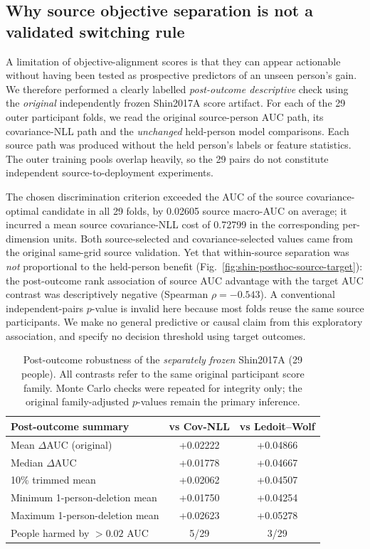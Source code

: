 \subsection{Why source objective separation is not a validated switching rule}
\label{sec:source-target-not-predictor}
A limitation of objective-alignment scores is that they can appear
actionable without having been tested as prospective predictors of an
unseen person's gain. We therefore performed a clearly labelled
\emph{post-outcome descriptive} check using the \emph{original}
independently frozen Shin2017A score artifact. For each of the 29
outer participant folds, we read the original source-person AUC
path, its covariance-NLL path and the \emph{unchanged} held-person
model comparisons. Each source path was produced without the
held person's labels or feature statistics. The outer training pools
overlap heavily, so the 29 pairs do not constitute independent
source-to-deployment experiments.

The chosen discrimination criterion exceeded the AUC of the
source covariance-optimal candidate in all 29 folds, by
0.02605 source macro-AUC on average; it incurred a mean
source covariance-NLL cost of 0.72799 in the corresponding
per-dimension units. Both source-selected and
covariance-selected values came from the original same-grid
source validation. Yet that within-source separation was
\emph{not} proportional to the held-person benefit
(Fig.~\ref{fig:shin-posthoc-source-target}): the post-outcome
rank association of source AUC advantage with the target
AUC contrast was descriptively negative (Spearman
$\rho=-0.543$). A conventional independent-pairs
$p$-value is invalid here because most folds reuse the same
source participants. We make no general predictive or causal
claim from this exploratory association, and specify no
decision threshold using target outcomes.

\begin{table}[tb]
\centering
\small
\caption{Post-outcome robustness of the \emph{separately frozen}
Shin2017A (29 people). All contrasts refer to the same
original participant score family. Monte Carlo checks were
repeated for integrity only; the original family-adjusted
$p$-values remain the primary inference.}
\label{tab:shin-posthoc-robust}
\begin{tabular}{lcc}
\toprule
Post-outcome summary & vs Cov-NLL & vs Ledoit--Wolf\\
\midrule
Mean $\Delta$AUC (original) & +0.02222 & +0.04866\\
Median $\Delta$AUC & +0.01778 & +0.04667\\
10\% trimmed mean & +0.02062 & +0.04507\\
Minimum 1-person-deletion mean & +0.01750 & +0.04254\\
Maximum 1-person-deletion mean & +0.02623 & +0.05278\\
People harmed by $>0.02$ AUC & 5/29 & 3/29\\
\bottomrule
\end{tabular}
\end{table}

